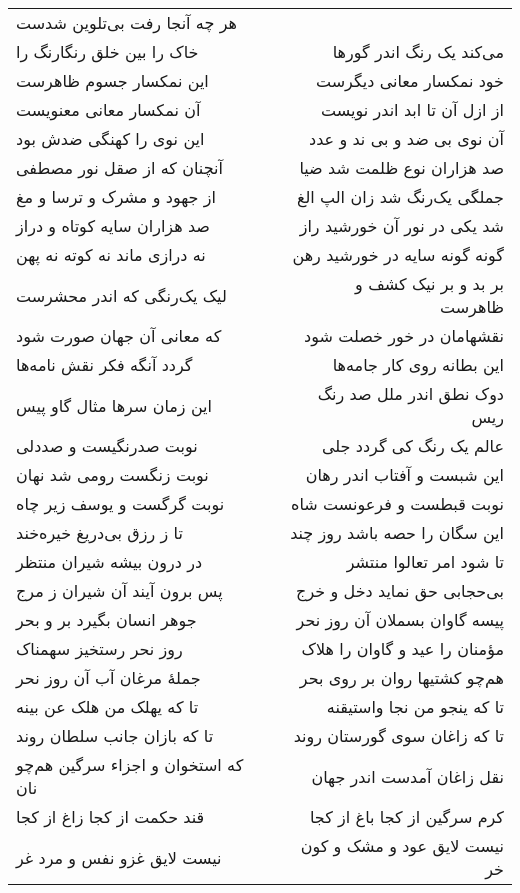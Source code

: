 \begin{center}
\begin{longtable}{l p{0.5cm} r}
هر چه آنجا رفت بی‌تلوین شدست
\\
خاک را بین خلق رنگارنگ را
&&
می‌کند یک رنگ اندر گورها
\\
این نمکسار جسوم ظاهرست
&&
خود نمکسار معانی دیگرست
\\
آن نمکسار معانی معنویست
&&
از ازل آن تا ابد اندر نویست
\\
این نوی را کهنگی ضدش بود
&&
آن نوی بی ضد و بی ند و عدد
\\
آنچنان که از صقل نور مصطفی
&&
صد هزاران نوع ظلمت شد ضیا
\\
از جهود و مشرک و ترسا و مغ
&&
جملگی یک‌رنگ شد زان الپ الغ
\\
صد هزاران سایه کوتاه و دراز
&&
شد یکی در نور آن خورشید راز
\\
نه درازی ماند نه کوته نه پهن
&&
گونه گونه سایه در خورشید رهن
\\
لیک یک‌رنگی که اندر محشرست
&&
بر بد و بر نیک کشف و ظاهرست
\\
که معانی آن جهان صورت شود
&&
نقشهامان در خور خصلت شود
\\
گردد آنگه فکر نقش نامه‌ها
&&
این بطانه روی کار جامه‌ها
\\
این زمان سرها مثال گاو پیس
&&
دوک نطق اندر ملل صد رنگ ریس
\\
نوبت صدرنگیست و صددلی
&&
عالم یک رنگ کی گردد جلی
\\
نوبت زنگست رومی شد نهان
&&
این شبست و آفتاب اندر رهان
\\
نوبت گرگست و یوسف زیر چاه
&&
نوبت قبطست و فرعونست شاه
\\
تا ز رزق بی‌دریغ خیره‌خند
&&
این سگان را حصه باشد روز چند
\\
در درون بیشه شیران منتظر
&&
تا شود امر تعالوا منتشر
\\
پس برون آیند آن شیران ز مرج
&&
بی‌حجابی حق نماید دخل و خرج
\\
جوهر انسان بگیرد بر و بحر
&&
پیسه گاوان بسملان آن روز نحر
\\
روز نحر رستخیز سهمناک
&&
مؤمنان را عید و گاوان را هلاک
\\
جملهٔ مرغان آب آن روز نحر
&&
هم‌چو کشتیها روان بر روی بحر
\\
تا که یهلک من هلک عن بینه
&&
تا که ینجو من نجا واستیقنه
\\
تا که بازان جانب سلطان روند
&&
تا که زاغان سوی گورستان روند
\\
که استخوان و اجزاء سرگین هم‌چو نان
&&
نقل زاغان آمدست اندر جهان
\\
قند حکمت از کجا زاغ از کجا
&&
کرم سرگین از کجا باغ از کجا
\\
نیست لایق غزو نفس و مرد غر
&&
نیست لایق عود و مشک و کون خر

\end{longtable}
\end{center}
